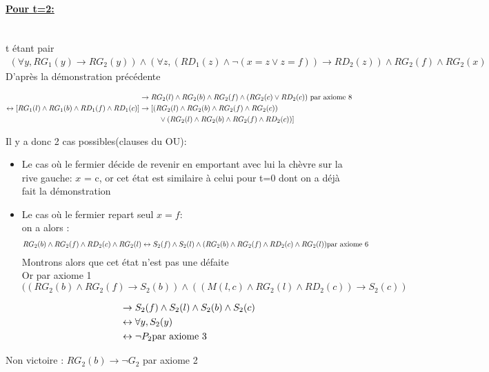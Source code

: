\documentclass{article}
\begin{document}
\newpage
\paragraph{\underline{Pour t=2:}}~~\\

t étant pair
\begin{align*}
    (\forall y, RG_{1}(y) \to RG_{2}(y)) \wedge (\forall z,(RD_{1}(z) \wedge \neg(x=z \vee z=f)) \rightarrow RD_{2}(z)) \wedge RG_2(f) \wedge RG_2(x)
\end{align*}
D'après la démonstration précédente

\begin{align*}
  [RG_1(l) \wedge RG_1(b) \wedge RD_1(f) \wedge RD_1(c)] &\to RG_2(l) \wedge RG_2(b) \wedge RG_2(f) \wedge (RG_2(c) \vee RD_2(c)) \text{ par axiome 8}\\
  \leftrightarrow [RG_1(l) \wedge RG_1(b) \wedge RD_1(f) \wedge RD_1(c)] &\to [(RG_2(l) \wedge RG_2(b) \wedge RG_2(f) \wedge RG_2(c))\\
  &\hphantom{aaaaa}\vee (RG_2(l) \wedge RG_2(b) \wedge RG_2(f) \wedge RD_2(c))]
\end{align*}

Il y a donc 2 cas possibles(clauses du OU):\\
\begin{itemize}
    \item \small Le cas où le fermier décide de revenir en emportant avec lui la chèvre sur la rive gauche: $x$ = c, or cet état est similaire à celui pour t=0 dont on a déjà fait la démonstration\\

    \item Le cas où le fermier repart seul $x=f$:\\
    on a alors :
    \begin{align*}
      RG_2(b) \wedge RG_2(f) \wedge RD_2(c) \wedge RG_2(l) &\leftrightarrow S_2(f) \wedge S_2(l) \wedge (RG_2(b) \wedge RG_2(f) \wedge RD_2(c) \wedge RG_2(l)) \text{par axiome $ 6$}\\
    \end{align*}
Montrons alors que cet état n'est pas une défaite\\
Or par axiome 1 $((RG_2(b) \wedge RG_2(f) \to S_2(b)) \wedge ((M(l,c) \wedge RG_2(l)\wedge RD_2(c)) \to S_2(c))$

\begin{align*}
  &\to  S_2(f) \wedge S_2(l) \wedge S_2(b) \wedge S_2(c)\\
  &\leftrightarrow \forall y, S_2(y)\\
  &\leftrightarrow \neg P_2 \text{par axiome $ 3$}
\end{align*}

\end{itemize}
    Non victoire : $RG_2(b) \to \neg G_2$ par axiome 2
\end{document}

